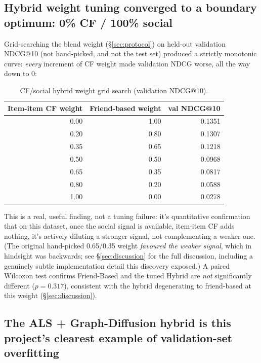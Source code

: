 \documentclass[11pt,a4paper]{article}
\newcommand{\secref}[1]{\S\ref{#1}}
\begin{document}
\subsection{Hybrid weight tuning converged to a boundary optimum: 0\% CF / 100\% social}

Grid-searching the blend weight (\secref{sec:protocol}) on held-out validation NDCG@10 (not hand-picked, and not the test set) produced a strictly monotonic curve: \emph{every} increment of CF weight made validation NDCG worse, all the way down to 0:

\begin{table}[!htbp]
\centering
\begin{tabular}{rrr}
\toprule
Item-item CF weight & Friend-based weight & val NDCG@10 \\
\midrule
0.00 & 1.00 & 0.1351 \\
0.20 & 0.80 & 0.1307 \\
0.35 & 0.65 & 0.1218 \\
0.50 & 0.50 & 0.0968 \\
0.65 & 0.35 & 0.0817 \\
0.80 & 0.20 & 0.0588 \\
1.00 & 0.00 & 0.0278 \\
\bottomrule
\end{tabular}
\caption{CF/social hybrid weight grid search (validation NDCG@10).}
\end{table}

This is a real, useful finding, not a tuning failure: it's quantitative confirmation that on this dataset, once the social signal is available, item-item CF adds nothing, it's actively diluting a stronger signal, not complementing a weaker one. (The original hand-picked 0.65/0.35 weight \emph{favoured the weaker signal}, which in hindsight was backwards; see \secref{sec:discussion} for the full discussion, including a genuinely subtle implementation detail this discovery exposed.) A paired Wilcoxon test confirms Friend-Based and the tuned Hybrid are \emph{not} significantly different ($p=0.317$), consistent with the hybrid degenerating to friend-based at this weight (\secref{sec:discussion}).

\subsection{The ALS + Graph-Diffusion hybrid is this project's clearest example of validation-set overfitting}
\end{document}
